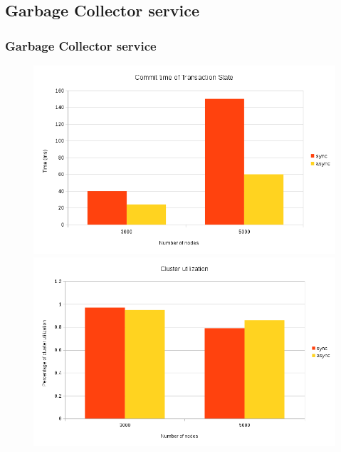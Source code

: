 \documentclass{beamer}
\begin{document}
\subsection{Garbage Collector service}
\begin{frame}
\frametitle{Garbage Collector service}
\begin{figure}
\centering
  \includegraphics[scale=0.27]{resources/async_commit_time.png}
\hfill
  \includegraphics[scale=0.27]{resources/async_cluster_util.png}
\end{figure}
\end{frame}
\end{document}
